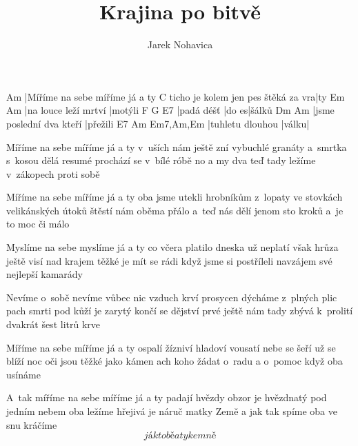 \documentclass{song}
\author{Jarek Nohavica}
\title{Krajina po bitvě}
\begin{document}
\strophe
Am
|Míříme na sebe míříme já a ty
                                   C
ticho je kolem jen pes štěká za vra|ty
Em                   Am
|na louce leží mrtví |motýli
F          G     E7
|padá déšť |do es|šálků
Dm                       Am
|jsme poslední dva kteří |přežili
E7               Am    Em7,Am,Em
|tuhletu dlouhou |válku|
\endstrophe

\begin{multicols}{2}
\strophe*
Míříme na sebe míříme já a ty
v~uších nám ještě zní vybuchlé granáty
a~smrtka s~kosou dělá resumé
prochází se v~bílé róbě
no a my dva teď tady ležíme
v~zákopech proti sobě
\endstrophe

\strophe*
Míříme na sebe míříme já a ty
oba jsme utekli hrobníkům z~lopaty
ve stovkách velikánských útoků
štěstí nám oběma přálo
a~teď nás dělí jenom sto kroků
a~je to moc či málo
\endstrophe

\strophe*
Myslíme na sebe myslíme já a ty
co včera platilo dneska už neplatí
však hrůza ještě visí nad krajem
těžké je mít se rádi
když jsme si postříleli navzájem
své nejlepší kamarády
\endstrophe

\strophe*
Nevíme o~sobě nevíme vůbec nic
vzduch krví prosycen dýcháme z~plných plic
pach smrti pod kůží je zarytý
končí se dějství prvé
ještě nám tady zbývá k~prolití
dvakrát šest litrů krve
\endstrophe

\strophe*
Míříme na sebe míříme já a ty
ospalí žízniví hladoví vousatí
nebe se šeří už se blíží noc
oči jsou těžké jako kámen
ach koho žádat o~radu a o~pomoc
když oba usínáme
\endstrophe

\strophe*
A~tak míříme na sebe míříme já a ty
padají hvězdy obzor je hvězdnatý
pod jedním nebem oba ležíme
hřejivá je náruč matky Země
a jak tak spíme oba ve snu kráčíme
\[ já k tobě a ty ke mně \]
\endstrophe
\end{multicols}
\end{document}
